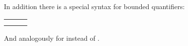 \begin{isabellebody}
\begin{isamarkuptext}
In addition there is a special syntax for bounded quantifiers:
\begin{center}
\begin{tabular}{lcl}
\isa{{\isasymforall}x{\isasymle}y{\isachardot}\ P\ x} & \isa{{\isasymrightleftharpoons}} & \isa{{\isachardoublequote}{\isasymforall}x{\isachardot}\ x\ {\isasymle}\ y\ {\isasymlongrightarrow}\ P\ x{\isachardoublequote}} \\
\isa{{\isasymexists}x{\isasymle}y{\isachardot}\ P\ x} & \isa{{\isasymrightleftharpoons}} & \isa{{\isachardoublequote}{\isasymexists}x{\isachardot}\ x\ {\isasymle}\ y\ {\isasymand}\ P\ x{\isachardoublequote}}
\end{tabular}
\end{center}
And analogously for \isa{{\isacharless}} instead of \isa{{\isasymle}}.%
\end{isamarkuptext}%
\isamarkuptrue%
%
\isadelimtheory
%
\endisadelimtheory
%
\isatagtheory
%
\endisatagtheory
{\isafoldtheory}%
%
\isadelimtheory
%
\endisadelimtheory
\end{isabellebody}%
